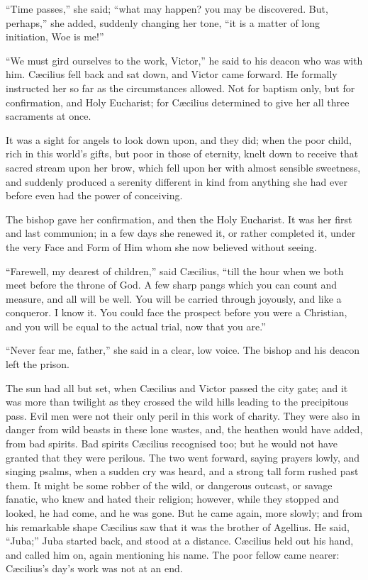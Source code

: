 ``Time passes,'' she said; ``what may happen? you may
be discovered. But, perhaps,'' she added, suddenly changing her
tone, ``it is a matter of long initiation, Woe is me!''

``We must gird ourselves to the work, Victor,'' he said to
his deacon who was with him. Cæcilius fell back and sat down, and
Victor came forward. He formally instructed her so far as the
circumstances allowed. Not for baptism only, but for confirmation, and
Holy Eucharist; for Cæcilius determined to give her all three
sacraments at once.

It was a sight for angels to look down upon, and they did;
when the poor child, rich in this world's gifts, but poor in those of
eternity, knelt down to receive that sacred stream upon her brow,
which fell upon her with almost sensible sweetness, and suddenly
produced a serenity different in kind from anything she had ever
before even had the power of conceiving.

The bishop gave her confirmation, and then the Holy Eucharist. It
was her first and last communion; in a few days she renewed it, or
rather completed it, under the very Face and Form of Him whom she now
believed without seeing.

``Farewell, my dearest of children,'' said Cæcilius,
``till the hour when we both meet before the throne of God. A few
sharp pangs which you can count and measure, and all will be well. You
will be carried through joyously, and like a conqueror. I know it. You
could face the prospect before you were a Christian, and you will be
equal to the actual trial, now that you are.''

``Never fear me, father,'' she said in a clear, low voice.
The bishop and his deacon left the prison.

The sun had all but set, when Cæcilius and Victor passed the city
gate; and it was more than twilight as they crossed the wild hills
leading to the precipitous pass. Evil men were not their only peril in
this work of charity. They were also in danger from wild beasts in
these lone wastes, and, the heathen would have added, from bad
spirits. Bad spirits Cæcilius recognised too; but he would not
have granted that they were perilous. The two went forward, saying
prayers lowly, and singing psalms, when a sudden cry was heard, and a
strong tall form rushed past them. It might be some robber of the
wild, or dangerous outcast, or savage fanatic, who knew and hated
their religion; however, while they stopped and looked, he had come,
and he was gone. But he came again, more slowly; and from his
remarkable shape Cæcilius saw that it was the brother of Agellius. He
said, ``Juba;'' Juba started back, and stood at a distance.
Cæcilius held out his hand, and called him on, again mentioning his
name. The poor fellow came nearer: Cæcilius's day's work was not at
an end.

